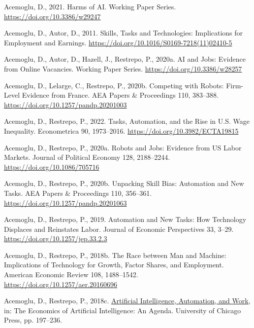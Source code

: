 \documentclass[
  12pt,
  a4paperpaper,
]{article}
\newlength{\cslhangindent}
\newenvironment{CSLReferences}[2] %
 {\begin{list}{}{%
  \setlength{\itemindent}{0pt}
  \setlength{\leftmargin}{0pt}
  \setlength{\parsep}{0pt}
  \ifodd #1
   \setlength{\leftmargin}{\cslhangindent}
   \setlength{\itemindent}{-1\cslhangindent}
  \fi
  \setlength{\itemsep}{#2\baselineskip}}}
 {\end{list}}
\begin{document}
\raggedright

\label{refs}
\begin{CSLReferences}{1}{0}
Acemoglu, D., 2021. Harms of {AI}. Working {Paper} {Series}.
\url{https://doi.org/10.3386/w29247}

Acemoglu, D., Autor, D., 2011. Skills, {Tasks} and {Technologies}:
{Implications} for {Employment} and {Earnings}.
\url{https://doi.org/10.1016/S0169-7218(11)02410-5}

Acemoglu, D., Autor, D., Hazell, J., Restrepo, P., 2020a. {AI} and
{Jobs}: {Evidence} from {Online} {Vacancies}. Working {Paper} {Series}.
\url{https://doi.org/10.3386/w28257}

Acemoglu, D., Lelarge, C., Restrepo, P., 2020b. Competing with {Robots}:
{Firm}-{Level} {Evidence} from {France}. AEA Papers \& Proceedings 110,
383--388. \url{https://doi.org/10.1257/pandp.20201003}

Acemoglu, D., Restrepo, P., 2022. Tasks, {Automation}, and the {Rise} in
{U}.{S}. {Wage} {Inequality}. Econometrica 90, 1973--2016.
\url{https://doi.org/10.3982/ECTA19815}

Acemoglu, D., Restrepo, P., 2020a. Robots and {Jobs}: {Evidence} from
{US} {Labor} {Markets}. Journal of Political Economy 128, 2188--2244.
\url{https://doi.org/10.1086/705716}

Acemoglu, D., Restrepo, P., 2020b. Unpacking {Skill} {Bias}:
{Automation} and {New} {Tasks}. AEA Papers \& Proceedings 110, 356--361.
\url{https://doi.org/10.1257/pandp.20201063}

Acemoglu, D., Restrepo, P., 2019. Automation and {New} {Tasks}: {How}
{Technology} {Displaces} and {Reinstates} {Labor}. Journal of Economic
Perspectives 33, 3--29. \url{https://doi.org/10.1257/jep.33.2.3}

Acemoglu, D., Restrepo, P., 2018b. The {Race} between {Man} and
{Machine}: {Implications} of {Technology} for {Growth}, {Factor}
{Shares}, and {Employment}. American Economic Review 108, 1488--1542.
\url{https://doi.org/10.1257/aer.20160696}

Acemoglu, D., Restrepo, P., 2018c.
\href{https://www.nber.org/books-and-chapters/economics-artificial-intelligence-agenda/artificial-intelligence-automation-and-work}{Artificial
{Intelligence}, {Automation}, and {Work}}, in: The {Economics} of
{Artificial} {Intelligence}: {An} {Agenda}. University of Chicago Press,
pp. 197--236.


\end{CSLReferences}
\end{document}
